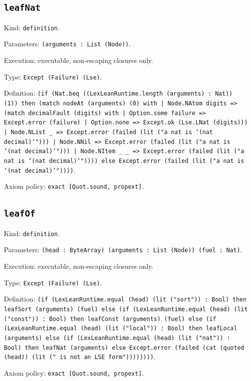 \documentclass[11pt]{article}
\begin{document}
\subsection*{\texttt{leafNat}}
\noindent Kind: \texttt{definition}.\par
\noindent Parameters: \texttt{(arguments : List (Node))}.\par
\noindent Execution: executable, non-escaping closures only.\par
\noindent Type: \texttt{Except (Failure) (Lse)}.\par
\noindent Definition: \texttt{(if (Nat.beq ((LexLeanRuntime.length (arguments) : Nat)) (1)) then (match nodeAt (arguments) (0) with | Node.NAtom digits => (match decimalFault (digits) with | Option.some failure => Except.error (failure) | Option.none => Except.ok (Lse.LNat (digits))) | Node.NList \_ => Except.error (failed (lit ("a nat is `(nat decimal)`"))) | Node.NNil => Except.error (failed (lit ("a nat is `(nat decimal)`"))) | Node.NItem \_ \_ => Except.error (failed (lit ("a nat is `(nat decimal)`")))) else Except.error (failed (lit ("a nat is `(nat decimal)`"))))}.\par
\noindent Axiom policy: \texttt{exact [Quot.sound, propext]}.\par
\subsection*{\texttt{leafOf}}
\noindent Kind: \texttt{definition}.\par
\noindent Parameters: \texttt{(head : ByteArray) (arguments : List (Node)) (fuel : Nat)}.\par
\noindent Execution: executable, non-escaping closures only.\par
\noindent Type: \texttt{Except (Failure) (Lse)}.\par
\noindent Definition: \texttt{(if (LexLeanRuntime.equal (head) (lit ("sort")) : Bool) then leafSort (arguments) (fuel) else (if (LexLeanRuntime.equal (head) (lit ("const")) : Bool) then leafConst (arguments) (fuel) else (if (LexLeanRuntime.equal (head) (lit ("local")) : Bool) then leafLocal (arguments) else (if (LexLeanRuntime.equal (head) (lit ("nat")) : Bool) then leafNat (arguments) else Except.error (failed (cat (quoted (head)) (lit (" is not an LSE form"))))))))}.\par
\noindent Axiom policy: \texttt{exact [Quot.sound, propext]}.\par
\end{document}
